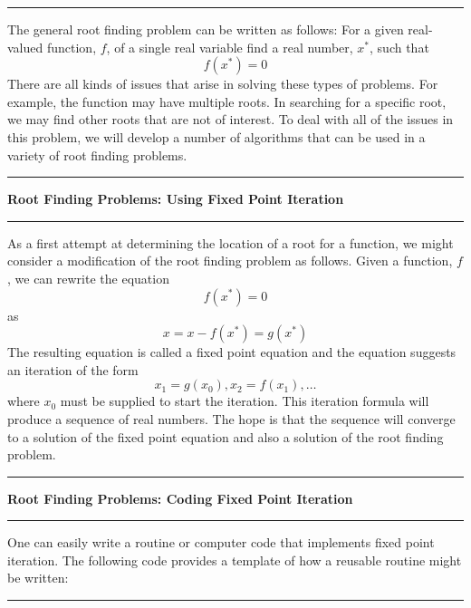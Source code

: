 \documentclass[10pt,fleqn]{article}
\begin{document}
\vskip0.1in\hrule\vskip0.1in
\noindent
The general root finding problem can be written as follows: For a given
real-valued function, $f$, of a single real variable find a real number, $x^*$,
such that
$$
  f(x^*) = 0
$$
There are all kinds of issues that arise in solving these types of problems.
For example, the function may have multiple roots. In searching for a specific
root, we may find other roots that are not of interest. To deal with all of the
issues in this problem, we will develop a number of algorithms that can be used
in a variety of root finding problems.
\vskip0.1in\hrule\vskip0.1in
\noindent
{\bf Root Finding Problems: Using Fixed Point Iteration} 
\vskip0.1in\hrule\vskip0.1in
\noindent
As a first attempt at determining the location of a root for a function, we
might consider a modification of the root finding problem as follows. Given a
function, $f$, we can rewrite the equation
$$
  f(x^*) = 0
$$
as
$$
  x = x - f(x^*) = g(x^*)
$$
The resulting equation is called a fixed point equation and the equation
suggests an iteration of the form
$$
  x_1 = g(x_0), x_2 = f(x_1), \ldots
$$
where $x_0$ must be supplied to start the iteration. This iteration formula will
produce a sequence of real numbers. The hope is that the sequence will converge
to a solution of the fixed point equation and also a solution of the root
finding problem.
\vskip0.1in\hrule\vskip0.1in
\noindent
{\bf Root Finding Problems: Coding Fixed Point Iteration} 
\vskip0.1in\hrule\vskip0.1in
\noindent
One can easily write a routine or computer code that implements fixed point
iteration. The following code provides a template of how a reusable routine
might be written:
\vskip0.1in\hrule\vskip0.1in
\end{document}
